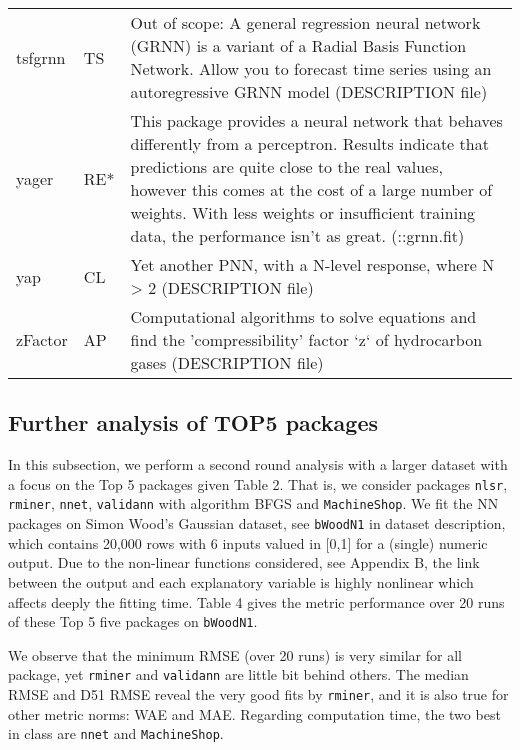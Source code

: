\begin{Schunk}
\begin{longtable}[t]{ll>{\raggedright\arraybackslash}p{10cm}}
tsfgrnn & TS & Out of scope: A general regression neural network (GRNN) is a variant of a Radial Basis Function Network. Allow you to forecast time series using an autoregressive GRNN model (DESCRIPTION file)\\
\addlinespace
yager & RE* & This package provides a neural network that behaves differently from a perceptron. Results indicate that predictions are quite close to the real values, however this comes at the cost of a large number of weights. With less weights or insufficient training data, the performance isn't as great. (::grnn.fit)\\
yap & CL & Yet another PNN, with a N-level response, where N > 2 (DESCRIPTION file)\\
zFactor & AP & Computational algorithms to solve equations and find the 'compressibility' factor `z` of hydrocarbon gases (DESCRIPTION file)\\*
\end{longtable}
\endgroup{}

\end{Schunk}

\hypertarget{further-analysis-of-top5-packages}{%
\subsection{Further analysis of TOP5
packages}\label{further-analysis-of-top5-packages}}

In this subsection, we perform a second round analysis with a larger
dataset with a focus on the Top 5 packages given Table 2. That is, we
consider packages \texttt{nlsr}, \texttt{rminer}, \texttt{nnet},
\texttt{validann} with algorithm BFGS and \texttt{MachineShop}. We fit
the NN packages on Simon Wood's Gaussian dataset, see \texttt{bWoodN1}
in dataset description, which contains 20,000 rows with 6 inputs valued
in {[}0,1{]} for a (single) numeric output. Due to the non-linear
functions considered, see Appendix B, the link between the output and
each explanatory variable is highly nonlinear which affects deeply the
fitting time. Table 4 gives the metric performance over 20 runs of these
Top 5 five packages on \texttt{bWoodN1}.

We observe that the minimum RMSE (over 20 runs) is very similar for all
package, yet \texttt{rminer} and \texttt{validann} are little bit behind
others. The median RMSE and D51 RMSE reveal the very good fits by
\texttt{rminer}, and it is also true for other metric norms: WAE and
MAE. Regarding computation time, the two best in class are \texttt{nnet}
and \texttt{MachineShop}.

